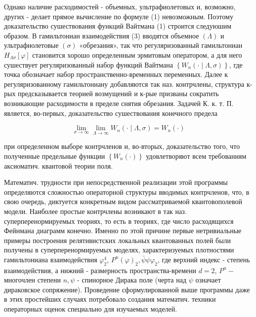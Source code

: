 \documentclass[10pt]{article}
\begin{document}
Однако наличие расходимостей - объемных, ультрафиолетовых и, возможно, других - делает прямое вычисление по формуле (1) невозможным. Поэтому доказательство сушествования функций Вайтмана (1) строится следуюшим образом. В гамильтониан взаимодействия (3) вводятся объемное $(\Lambda)$ и ультрафиолетовые $(\sigma)$ «обрезания», так что регуляризованный гамильтониан $H_{\Lambda \sigma}[\varphi]$ становится хорошо определенным эрмитовым оператором, а для него сушествует регуляризованный набор функций Вайтмана $\left\{W_{n}(\cdot \mid \Lambda, \sigma)\right\}$, где точка обозначает набор пространственно-временных переменных. Далее к регуляризованному гамильтониану добавляются так наз. контрчлены, структура к-рых предсказывается теорией возмущений и к-рые призваны сократить возникающие расходимости в пределе снятия обрезания. Задачей К. к. т. П. является, во-первых, доказательство сушествования конечного предела



\[

\lim _{\sigma \rightarrow \infty} \lim _{\Lambda \rightarrow \infty} W_{n}(\cdot \mid \Lambda, \sigma)=W_{n}(\cdot)

\]



при определенном выборе контрчленов и, во-вторых, доказательство того, что полученные предельные функции $\left\{W_{n}(\cdot)\right\}$ удовлетворяют всем требованиям аксиоматич. квантовой теории поля.



Математич. трудности при непосредственной реализации этой программы определяются сложностью операторной структуры вводимых контрчленов, что, в свою очередь, диктуется конкретным видом рассматриваемой квантовополевой модели. Наиболее простые контрчлены возникают в так наз. суперперенормируемых теориях, то есть в теориях, где число расходящихся Фейнмана диаграмм конечно. Именно по этой причине первые нетривиальные примеры построения релятивистских локальных квантованных полей были получены в суперперенормируемых моделях, характеризуемых плотностями гамильтониана взаимодействия $\varphi_{2}^{4}$, $P^{n}(\varphi)_{2}, \bar{\psi} \psi \varphi_{2}$, где верхний индекс - степень взаимодействия, а нижний - размерность пространства-времени $d=2$, $P^{n}-$ многочлен степени $n, \psi$ - спинорное Дирака поле (черта над $\psi$ означает дираковское сопряжение). Проведение сформулированной выше программы даже в этих простейших случаях потребовало создания математич. техники операторных оценок специально для изучаемых моделей.
\end{document}
